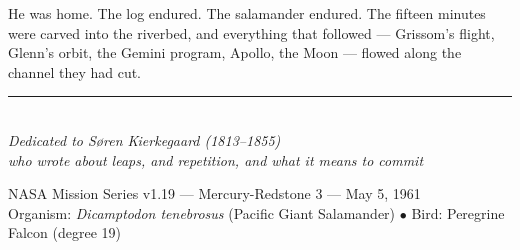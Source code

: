 \documentclass[12pt, letterpaper]{article}
\begin{document}
He was home. The log endured. The salamander endured. The fifteen minutes were carved into the riverbed, and everything that followed --- Grissom's flight, Glenn's orbit, the Gemini program, Apollo, the Moon --- flowed along the channel they had cut.

\vspace{2em}
\begin{center}
\rule{3cm}{0.4pt}\\[1em]
\textit{Dedicated to S\o ren Kierkegaard (1813--1855)\\who wrote about leaps, and repetition, and what it means to commit}
\end{center}

\vspace{2em}
\begin{center}
\small
NASA Mission Series v1.19 --- Mercury-Redstone 3 --- May 5, 1961\\
Organism: \textit{Dicamptodon tenebrosus} (Pacific Giant Salamander) $\bullet$ Bird: Peregrine Falcon (degree 19)
\end{center}
\end{document}
